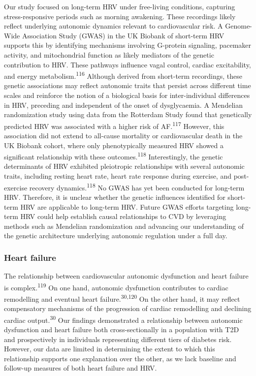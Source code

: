 \documentclass[
  letterpaper,
  headsepline=true,
  open=any]{scrbook}
\begin{document}
Our study focused on long-term HRV under free-living conditions,
capturing stress-responsive periods such as morning awakening. These
recordings likely reflect underlying autonomic dynamics relevant to
cardiovascular risk. A Genome-Wide Association Study (GWAS) in the UK
Biobank of short-term HRV supports this by identifying mechanisms
involving G-protein signaling, pacemaker activity, and mitochondrial
function as likely mediators of the genetic contribution to HRV. These
pathways influence vagal control, cardiac excitability, and energy
metabolism.\textsuperscript{116} Although derived from short-term
recordings, these genetic associations may reflect autonomic traits that
persist across different time scales and reinforce the notion of a
biological basis for inter-individual differences in HRV, preceding and
independent of the onset of dysglycaemia. A Mendelian randomization
study using data from the Rotterdam Study found that genetically
predicted HRV was associated with a higher risk of
AF.\textsuperscript{117} However, this association did not extend to
all-cause mortality or cardiovascular death in the UK Biobank cohort,
where only phenotypically measured HRV showed a significant relationship
with these outcomes.\textsuperscript{118} Interestingly, the genetic
determinants of HRV exhibited pleiotropic relationships with several
autonomic traits, including resting heart rate, heart rate response
during exercise, and post-exercise recovery
dynamics.\textsuperscript{118} No GWAS has yet been conducted for
long-term HRV. Therefore, it is unclear whether the genetic influences
identified for short-term HRV are applicable to long-term HRV. Future
GWAS efforts targeting long-term HRV could help establish causal
relationships to CVD by leveraging methods such as Mendelian
randomization and advancing our understanding of the genetic
architecture underlying autonomic regulation under a full day.

\hypertarget{heart-failure-1}{%
\subsubsection{Heart failure}\label{heart-failure-1}}

The relationship between cardiovascular autonomic dysfunction and heart
failure is complex.\textsuperscript{119} On one hand, autonomic
dysfunction contributes to cardiac remodelling and eventual heart
failure.\textsuperscript{30,120} On the other hand, it may reflect
compensatory mechanisms of the progression of cardiac remodelling and
declining cardiac output.\textsuperscript{30} Our findings demonstrated
a relationship between autonomic dysfunction and heart failure both
cross-sectionally in a population with T2D and prospectively in
individuals representing different tiers of diabetes risk. However, our
data are limited in determining the extent to which this relationship
supports one explanation over the other, as we lack baseline and
follow-up measures of both heart failure and HRV.
\end{document}
